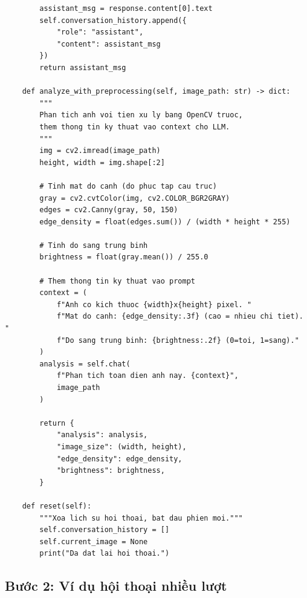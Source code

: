\begin{verbatim}
        assistant_msg = response.content[0].text
        self.conversation_history.append({
            "role": "assistant",
            "content": assistant_msg
        })
        return assistant_msg

    def analyze_with_preprocessing(self, image_path: str) -> dict:
        """
        Phan tich anh voi tien xu ly bang OpenCV truoc,
        them thong tin ky thuat vao context cho LLM.
        """
        img = cv2.imread(image_path)
        height, width = img.shape[:2]

        # Tinh mat do canh (do phuc tap cau truc)
        gray = cv2.cvtColor(img, cv2.COLOR_BGR2GRAY)
        edges = cv2.Canny(gray, 50, 150)
        edge_density = float(edges.sum()) / (width * height * 255)

        # Tinh do sang trung binh
        brightness = float(gray.mean()) / 255.0

        # Them thong tin ky thuat vao prompt
        context = (
            f"Anh co kich thuoc {width}x{height} pixel. "
            f"Mat do canh: {edge_density:.3f} (cao = nhieu chi tiet). "
            f"Do sang trung binh: {brightness:.2f} (0=toi, 1=sang)."
        )
        analysis = self.chat(
            f"Phan tich toan dien anh nay. {context}",
            image_path
        )

        return {
            "analysis": analysis,
            "image_size": (width, height),
            "edge_density": edge_density,
            "brightness": brightness,
        }

    def reset(self):
        """Xoa lich su hoi thoai, bat dau phien moi."""
        self.conversation_history = []
        self.current_image = None
        print("Da dat lai hoi thoai.")
\end{verbatim}

\subsection{Bước 2: Ví dụ hội thoại nhiều lượt}
\label{subsec:va_multiturn}

